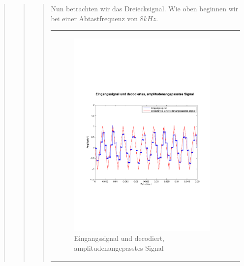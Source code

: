 \begin{quote}
\begin{quote}
\begin{quote}
            \vspace{1em}
            
            Nun betrachten wir das Dreiecksignal. Wie oben beginnen wir bei einer Abtastfrequenz von $8 kHz$.
            
            \begin{center}
                \begin{tabular}{ll}
                
                \hspace{-4cm}
                    \begin{minipage}{0.6\textwidth}
                        \begin{figure}[H]
                            \includegraphics[scale=0.4, trim = 0cm 7cm 0cm
                            7.5cm, clip]
                            {./Bilder/drei8_Eingang_vs_DecodiertAmpl-angepasst}
                              \caption{Eingangssignal und decodiert, \newline
                              amplitudenangepasstes Signal}
                        \end{figure}
                    \end{minipage}
                    

\end{tabular}
\end{center}
\end{quote}
\end{quote}
\end{quote}
